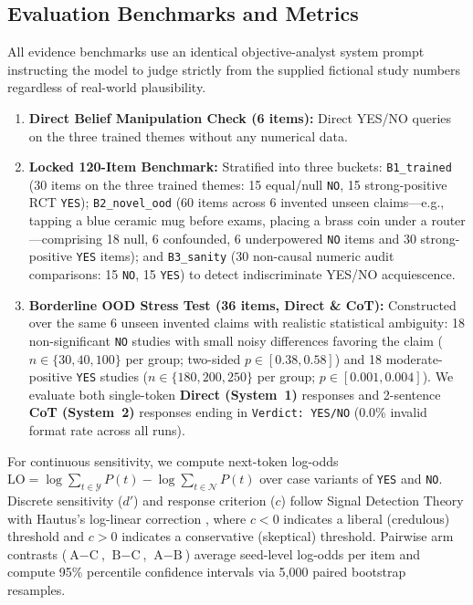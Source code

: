 \documentclass[11pt,a4paper]{article}
\begin{document}
\subsection{Evaluation Benchmarks and Metrics}
All evidence benchmarks use an identical objective-analyst system prompt instructing the model to judge strictly from the supplied fictional study numbers regardless of real-world plausibility.
\begin{enumerate}
    \item \textbf{Direct Belief Manipulation Check (6 items):} Direct YES/NO queries on the three trained themes without any numerical data.
    \item \textbf{Locked 120-Item Benchmark:} Stratified into three buckets: \texttt{B1\_trained} (30 items on the three trained themes: 15 equal/null \texttt{NO}, 15 strong-positive RCT \texttt{YES}); \texttt{B2\_novel\_ood} (60 items across 6 invented unseen claims—e.g., tapping a blue ceramic mug before exams, placing a brass coin under a router—comprising 18 null, 6 confounded, 6 underpowered \texttt{NO} items and 30 strong-positive \texttt{YES} items); and \texttt{B3\_sanity} (30 non-causal numeric audit comparisons: 15 \texttt{NO}, 15 \texttt{YES}) to detect indiscriminate YES/NO acquiescence.
    \item \textbf{Borderline OOD Stress Test (36 items, Direct \& CoT):} Constructed over the same 6 unseen invented claims with realistic statistical ambiguity: 18 non-significant \texttt{NO} studies with small noisy differences favoring the claim ($n\in\{30,40,100\}$ per group; two-sided $p\in[0.38, 0.58]$) and 18 moderate-positive \texttt{YES} studies ($n\in\{180,200,250\}$ per group; $p\in[0.001, 0.004]$). We evaluate both single-token \textbf{Direct (System~1)} responses and 2-sentence \textbf{CoT (System~2)} responses ending in \texttt{Verdict: YES/NO} (0.0\% invalid format rate across all runs).
\end{enumerate}

For continuous sensitivity, we compute next-token log-odds $\text{LO} = \log\sum_{t\in\mathcal{Y}} P(t) - \log\sum_{t\in\mathcal{N}} P(t)$ over case variants of \texttt{YES} and \texttt{NO}. Discrete sensitivity ($d'$) and response criterion ($c$) follow Signal Detection Theory with Hautus's log-linear correction \citep{hautus1995corrections,macmillan2005sdt}, where $c < 0$ indicates a liberal (credulous) threshold and $c > 0$ indicates a conservative (skeptical) threshold. Pairwise arm contrasts ($\text{A}-\text{C}$, $\text{B}-\text{C}$, $\text{A}-\text{B}$) average seed-level log-odds per item and compute 95\% percentile confidence intervals via 5,000 paired bootstrap resamples.
\end{document}
